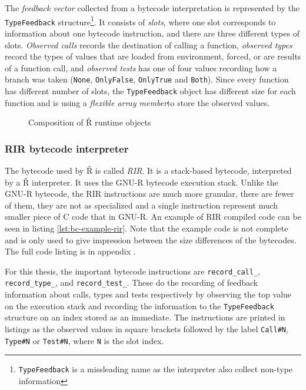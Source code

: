 The \textit{feedback vector} collected from a bytecode interpretation is represented by the \texttt{TypeFeedback} structure\footnote{\texttt{TypeFeedback} is a missleading name as the interpreter also collect non-type information}. It consists of \textit{slots}, where one slot corresponds to information about one bytecode instruction, and there are three different types of slots. \textit{Observed calls} records the destination of calling a function, \textit{observed types} record the types of values that are loaded from environment, forced, or are results of a function call, and \textit{observed tests} has one of four values recording how a branch was taken (\texttt{None}, \texttt{OnlyFalse}, \texttt{OnlyTrue} and \texttt{Both}). Since every function has different number of slots, the \texttt{TypeFeedback} object has different size for each function and is using a \textit{flexible array member}\todocite to store the observed values.

\begin{figure}
	\centering
	\caption{Composition of Ř runtime objects}\label{fig:rsh-composition}
\end{figure}

\subsubsection*{RIR bytecode interpreter}

The bytecode used by Ř is called \textit{RIR}. It is a stack-based bytecode, interpreted by a Ř interpreter. It uses the GNU-R bytecode execution stack. Unlike the GNU-R bytecode, the RIR instructions are much more granular, there are fewer of them, they are not as specialized and a single instruction represent much smaller piece of C code that in GNU-R. An example of RIR compiled code can be seen in listing \ref{lst:bc-example-rir}. Note that the example code is not complete and is only used to give impression between the size differences of the bytecodes. The full code listing is in appendix \todoadd.

For this thesis, the important bytecode instructions are \texttt{record\_call\_}, \texttt{record\_type\_}, and \texttt{record\_test\_}. These do the recording of feedback information about calls, types and tests respectively by observing the top value on the execution stack and recording the information to the \texttt{TypeFeedback} structure on an index stored as an immediate. The instructions are printed in listings as the observed values in square brackets followed by the label \texttt{Call\#N}, \texttt{Type\#N} or \texttt{Test\#N}, where \texttt{N} is the slot index.

